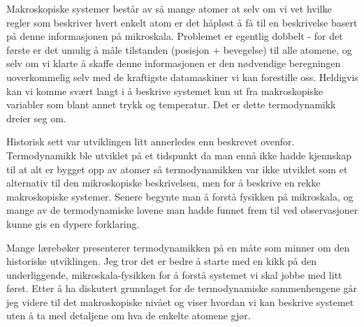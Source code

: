 \documentclass[a4paper,norsk,12pt]{book}
\begin{document}
\tableofcontents

\pagebreak
Makroskopiske systemer består av så mange atomer at selv om vi vet hvilke regler som beskriver hvert enkelt atom er det håpløst å få til en beskrivelse basert på denne informasjonen på mikroskala. Problemet er egentlig dobbelt - for det første er det umulig å måle tilstanden (posisjon + bevegelse) til alle atomene, og selv om vi klarte å skaffe denne informasjonen er den nødvendige beregningen uoverkommelig selv med de kraftigste datamaskiner vi kan forestille oss. Heldigvis kan vi komme svært langt i å beskrive systemet kun ut fra makroskopiske variabler som blant annet trykk og temperatur. Det er dette termodynamikk dreier seg om.

Historisk sett var utviklingen litt annerledes enn beskrevet ovenfor. Termodynamikk ble utviklet på et tidspunkt da man ennå ikke hadde kjennskap til at alt er bygget opp av atomer så termodynamikken var ikke utviklet som et alternativ til den mikroskopiske beskrivelsen, men for å beskrive en rekke makroskopiske systemer. Senere begynte man å forstå fysikken på mikroskala, og mange av de termodynamiske lovene man hadde funnet frem til ved observasjoner kunne gis en dypere forklaring.

Mange lærebøker presenterer termodynamikken på en måte som minner om den historiske utviklingen. Jeg tror det er bedre å starte med en kikk på den underliggende, mikroskala-fysikken for å forstå systemet vi skal jobbe med litt først. Etter å ha diskutert grunnlaget for de termodynamiske sammenhengene går jeg videre til det makroskopiske nivået og viser hvordan vi kan beskrive systemet uten å ta med detaljene om hva de enkelte atomene gjør.





\appendix

\end{document}
